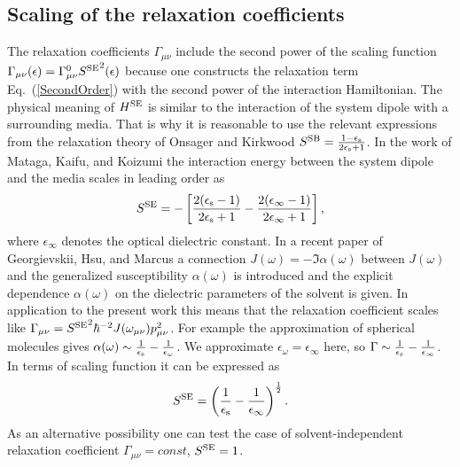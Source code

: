 \documentclass[12pt,twoside,a4paper]{report}
\begin{document}
 
\subsection{Scaling of the relaxation coefficients\label{chem-scaling}}
The relaxation coefficients $\Gamma_{\mu{}\nu}$ include the second
power of the scaling function 
$\Gamma_{\mu{}  \nu}(\epsilon)=\Gamma^{0}_{\mu{}\nu}{S^{\rm SE}}^2(\epsilon)$
because one constructs the relaxation term Eq.~(\ref{SecondOrder}) 
with the second power of the interaction Hamiltonian.
The physical meaning of $H^{\rm SE}$ is similar to the interaction
of the system dipole with a surrounding media.  
That is why it is reasonable to
use the relevant expressions from the relaxation theory of Onsager and
Kirkwood \cite{Boettcher} 
$S
 ^{\rm 
   SB}
        =
           \frac
               {1-\epsilon_{\rm s}}
               {2\epsilon_{\rm s}+1}$. 
In the work of Mataga, Kaifu, and Koizumi  \cite{Mataga} the interaction energy 
between the system dipole and the media scales in leading order as 
\begin{equation}
\label{Mataga-scaling}
S^{\rm SE}   =  -   \left[
                        \frac{2(\epsilon_{\rm s}-1)}
                             {2\epsilon_{\rm s}+1}
                     -  \frac{2(\epsilon_\infty-1)}
                             {2\epsilon_\infty+1}
                    \right],
\end{equation}
where $\epsilon_\infty$
denotes the optical dielectric constant.
In a recent paper of Georgievskii, Hsu, and Marcus \cite{Georgievski} 
 a connection  $J(\omega)=-{\Im} \alpha(\omega)$ between 
 $J(\omega)$ and the generalized susceptibility 
$\alpha(\omega)$  is  introduced
and the explicit dependence $\alpha(\omega)$
on the dielectric parameters of the solvent is given.  
In application to the present
work this means that the relaxation coefficient scales like
$\Gamma_{\mu{}\nu}   
                     =   {S^{\rm SE}}^2 \hbar^{-2} 
                         J(\omega_{\mu \nu})p^2_{\mu{}\nu}$.  
For example
the approximation of spherical molecules gives 
$\alpha(\omega) 
                  \sim  \frac{1}{\epsilon_{\rm s}}
                       -\frac{1}{\epsilon_\omega}$.  
We approximate $\epsilon_\omega=\epsilon_\infty$ here, so 
$\Gamma  \sim  
               \frac{1}{\epsilon_{\rm s}}
              -\frac{1}{\epsilon_\infty}$.
In terms of scaling function it can be expressed as
\begin{eqnarray}
\label{Marcus-scaling}
S^{\rm SE}
           =   \left(
                   \frac{1}{\epsilon_{\rm s}}
                -  \frac{1}{\epsilon_\infty} 
               \right)^\frac{1}{2}.
\end{eqnarray}
As an alternative possibility one can test the case of
solvent-independent relaxation coefficient $\Gamma_{\mu{}\nu}=const$,
$S^{\rm SE}=1$.
\end{document}
